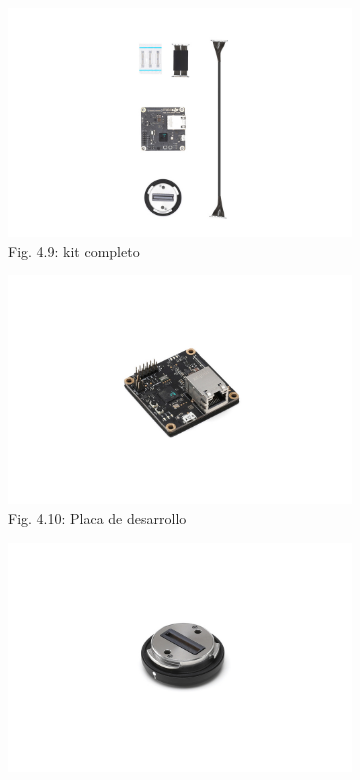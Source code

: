 \documentclass[12pt]{article}
\begin{document}
\begin{figure}[ht]
  \centering
  \begin{subfigure}[b]{0.45\linewidth}
    \includegraphics[width=\linewidth]{images/Payload-DBK-1.jpg}
    \caption{Fig. 4.9: kit completo}
  \end{subfigure}
  \begin{subfigure}[b]{0.45\linewidth}
    \includegraphics[width=\linewidth]{images/Payload-DBK-2.jpg}
    \caption{Fig. 4.10: Placa de desarrollo}
  \end{subfigure}
  \begin{subfigure}[b]{0.45\linewidth}
    \includegraphics[width=\linewidth]{images/Payload-DBK-3.jpg}

\end{subfigure}
\end{figure}
\end{document}
